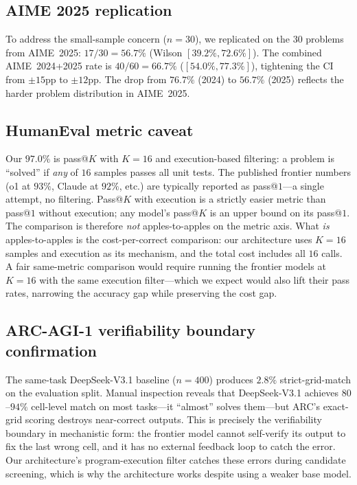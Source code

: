 \documentclass[11pt]{amsart}
\newcommand\1{{\mathds{1}}}
\theoremstyle{definition}
\theoremstyle{remark}
\numberwithin{equation}{section}
\begin{document}
\subsection{AIME 2025 replication}

To address the small-sample concern ($n\!=\!30$), we replicated on the $30$ problems from AIME~2025: $17/30 = 56.7\%$ (Wilson $[39.2\%, 72.6\%]$).
The combined AIME~2024+2025 rate is $40/60 = 66.7\%$ ($[54.0\%, 77.3\%]$), tightening the CI from $\pm 15$pp to $\pm 12$pp.
The drop from $76.7\%$ (2024) to $56.7\%$ (2025) reflects the harder problem distribution in AIME~2025.

\subsection{HumanEval metric caveat}

Our $97.0\%$ is pass@$K$ with $K\!=\!16$ and execution-based filtering: a problem is ``solved'' if \emph{any} of $16$ samples passes all unit tests.
The published frontier numbers (o1 at $93\%$, Claude at $92\%$, etc.) are typically reported as pass@$1$---a single attempt, no filtering.
Pass@$K$ with execution is a strictly easier metric than pass@$1$ without execution; any model's pass@$K$ is an upper bound on its pass@$1$.
The comparison is therefore \emph{not} apples-to-apples on the metric axis.
What \emph{is} apples-to-apples is the cost-per-correct comparison: our architecture uses $K\!=\!16$ samples and execution as its mechanism, and the total cost includes all $16$ calls.
A fair same-metric comparison would require running the frontier models at $K\!=\!16$ with the same execution filter---which we expect would also lift their pass rates, narrowing the accuracy gap while preserving the cost gap.

\subsection{ARC-AGI-1 verifiability boundary confirmation}

The same-task DeepSeek-V3.1 baseline ($n\!=\!400$) produces $2.8\%$ strict-grid-match on the evaluation split.
Manual inspection reveals that DeepSeek-V3.1 achieves $80$--$94\%$ cell-level match on most tasks---it ``almost'' solves them---but ARC's exact-grid scoring destroys near-correct outputs.
This is precisely the verifiability boundary in mechanistic form: the frontier model cannot self-verify its output to fix the last wrong cell, and it has no external feedback loop to catch the error.
Our architecture's program-execution filter catches these errors during candidate screening, which is why the architecture works despite using a weaker base model.
\end{document}
